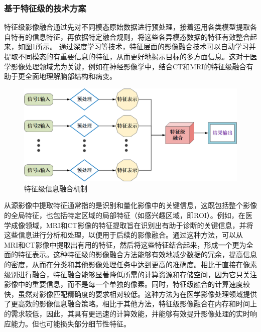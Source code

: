 \subsubsection{基于特征级的技术方案}
特征级影像融合通过先对不同模态原始数据进行预处理，接着运用各类模型提取各自特有的信息特征，再依据特定融合规则，将这些各异模态数据的特征有效整合起来，如图\ref{featureFusion}所示。
通过深度学习等技术，特征层面的影像融合技术可以自动学习并提取不同模态的有重要信息的特征，从而更好地揭示目标的多方面信息。这对于医学影像处理领域尤为关键，例如在神经影像学中，结合CT和MRI的特征级融合有助于更全面地理解脑部结构和病变。

   \begin{figure}[htbp]
      \centering  
      \includegraphics[width=0.9\linewidth]{figs/featureFusion.png}
      \caption{特征级信息融合机制}\label{featureFusion}
    \end{figure}

从源影像中提取特征通常指的是识别和量化影像中的关键信息，这既包括整个影像的全局特征，也包括特定区域的局部特征（如感兴趣区域，即ROI）。例如，在医学成像领域，MRI和CT影像的特征提取旨在识别出有助于诊断的关键信息，并将这些信息进行分析和处理，以便用于后续的影像融合。通过这种方法，可以从MRI和CT影像中提取出有用的特征，然后将这些特征结合起来，形成一个更为全面的特征表示。这种特征级的影像融合方法能够有效地减少数据的冗余，提高信息的密度，从而在分类和其他影像处理任务中达到更高的准确度。相比于直接在像素级别进行融合，特征融合能够显著降低所需的计算资源和存储空间，因为它只关注影像中的重要信息，而不是每一个单独的像素。同时，特征级融合的计算速度较快，虽然对影像匹配精确度的要求相对较低。这种方法为在医学影像处理领域提供了更高效的影像信息融合策略。相比于其他方法，特征级影像融合在内存和时间上的需求较低，因此，其具有更迅速的计算效能，并能够有效提升影像处理的实时响应能力。但也可能损失部分细节性特征。

